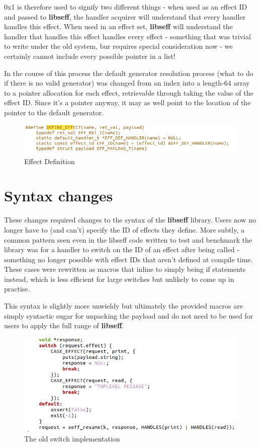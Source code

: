 \documentclass[logo,bsc,singlespacing,parskip,online]{infthesis}
\begin{document}
0x1 is therefore used to signify two different things - when used as an effect ID and passed to \textbf{libseff}, the handler acquirer will understand that every handler handles this effect. When used in an effect set, \textbf{libseff} will understand the handler that handles this effect handles every effect - something that was trivial to write under the old system, bur requires special consideration now - we certainly cannot include every possible pointer in a list!

In the course of this process the default generator resolution process (what to do if there is no valid generator) was changed from an index into a length-64 array to a pointer allocation for each effect, retrievable through taking the value of the effect ID. Since it's a pointer anyway, it may as well point to the location of the pointer to the default generator.

\begin{figure}[h]
    \centering
    \includegraphics[width=1\linewidth]{defeff.png}
    \caption{Effect Definition}
    \label{fig:joooo}
\end{figure}

\section{Syntax changes}

These changes required changes to the syntax of the \textbf{libseff} library. Users now no longer have to (and can't) specify the ID of effects they define. More subtly, a common pattern seen even in the libseff code written to test and benchmark the library was for a handler to switch on the ID of an effect after being called - something no longer possible with effect IDs that aren't defined at compile time. These cases were rewritten as macros that inline to simply being if statements instead, which is less efficient for large switches but unlikely to come up in practise.

This syntax is slightly more unwieldy but ultimately the provided macros are simply syntactic sugar for unpacking the payload and do not need to be used for users to apply the full range of \textbf{libseff}.

\begin{figure}[h]
    \centering
    \includegraphics[width=1\linewidth]{oldswitch.png}
    \caption{The old switch implementation}
    \label{fig:oldswitch}
\end{figure}
\end{document}
